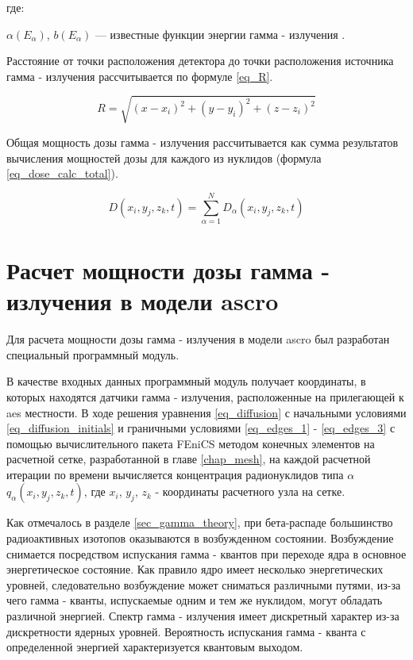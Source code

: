 где:
\begin{description}
    \item $\alpha(E_{\alpha})$, $b (E_{\alpha}) $ --- известные функции энергии гамма - излучения \cite{mashkovich}.
\end{description}

Расстояние от точки расположения детектора до точки расположения источника гамма - излучения рассчитывается по формуле
\ref{eq_R}.

\begin{equation}
    \label{eq_R}
    R = \sqrt{(x - x_i)^2 + (y - y_i)^2 + (z - z_i)^2}
\end{equation}

Общая мощность дозы гамма - излучения рассчитывается как сумма результатов вычисления мощностей дозы для каждого из
нуклидов (формула \ref{eq_dose_calc_total}).

\begin{equation}
    \label{eq_dose_calc_total}
    D(x_i, y_j, z_k, t) = \sum_{\alpha = 1}^{N} D_{\alpha} (x_i, y_j, z_k, t)
\end{equation}

\section{Расчет мощности дозы гамма - излучения в модели \ac{ascro}}

Для расчета мощности дозы гамма - излучения в модели \ac{ascro} был разработан специальный программный модуль.

В качестве входных данных программный модуль получает координаты, в которых находятся датчики гамма - излучения, 
расположенные на прилегающей к \ac{aes} местности. В ходе решения уравнения \ref{eq_diffusion} с начальными условиями 
\ref{eq_diffusion_initials} и граничными условиями \ref{eq_edges_1} - \ref{eq_edges_3} с помощью вычислительного 
пакета FEniCS методом конечных элементов на расчетной сетке, разработанной в главе \ref{chap_mesh}, на каждой расчетной 
итерации по времени вычисляется концентрация радионуклидов типа $\alpha$ $q_{\alpha}(x_i, y_j, z_k, t)$, где $x_i$, $y_j$, 
$z_k$ - координаты расчетного узла на сетке. 

Как отмечалось в разделе \ref{sec_gamma_theory}, при бета-распаде большинство радиоактивных изотопов оказываются в 
возбужденном состоянии. Возбуждение снимается посредством испускания гамма - квантов при переходе ядра в основное 
энергетическое состояние. Как правило ядро имеет несколько энергетических уровней, следовательно возбуждение может 
сниматься различными путями, из-за чего гамма - кванты, испускаемые одним и тем же нуклидом, могут обладать различной 
энергией. Спектр гамма - излучения имеет дискретный характер из-за дискретности ядерных уровней. Вероятность испускания 
гамма - кванта с определенной энергией характеризуется квантовым выходом.

